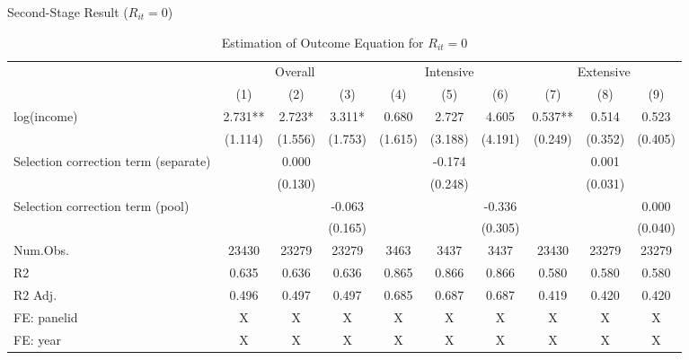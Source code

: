 \documentclass[
  ignorenonframetext,
  aspectratio=169,
]{beamer}
\begin{document}
\begin{frame}{Second-Stage Result (\(R_{it} = 0\))}
\protect\hypertarget{second-stage-result-r_it-0}{}
\begin{table}

\caption{\label{tab:unnamed-chunk-22}Estimation of Outcome Equation for $R_{it} = 0$}
\centering
\fontsize{6}{8}\selectfont
\begin{tabular}[t]{lccccccccc}
\toprule
\multicolumn{1}{c}{ } & \multicolumn{3}{c}{Overall} & \multicolumn{3}{c}{Intensive} & \multicolumn{3}{c}{Extensive} \\
\cmidrule(l{3pt}r{3pt}){2-4} \cmidrule(l{3pt}r{3pt}){5-7} \cmidrule(l{3pt}r{3pt}){8-10}
  & (1) & (2) & (3) & (4) & (5) & (6) & (7) & (8) & (9)\\
\midrule
log(income) & 2.731** & 2.723* & 3.311* & 0.680 & 2.727 & 4.605 & 0.537** & 0.514 & 0.523\\
 & (1.114) & (1.556) & (1.753) & (1.615) & (3.188) & (4.191) & (0.249) & (0.352) & (0.405)\\
Selection correction term (separate) &  & 0.000 &  &  & -0.174 &  &  & 0.001 & \\
 &  & (0.130) &  &  & (0.248) &  &  & (0.031) & \\
Selection correction term (pool) &  &  & -0.063 &  &  & -0.336 &  &  & 0.000\\
 &  &  & (0.165) &  &  & (0.305) &  &  & (0.040)\\
\midrule
Num.Obs. & 23430 & 23279 & 23279 & 3463 & 3437 & 3437 & 23430 & 23279 & 23279\\
R2 & 0.635 & 0.636 & 0.636 & 0.865 & 0.866 & 0.866 & 0.580 & 0.580 & 0.580\\
R2 Adj. & 0.496 & 0.497 & 0.497 & 0.685 & 0.687 & 0.687 & 0.419 & 0.420 & 0.420\\
FE: panelid & X & X & X & X & X & X & X & X & X\\
FE: year & X & X & X & X & X & X & X & X & X\\
\bottomrule
\end{tabular}
\end{table}
\end{frame}
\end{document}
